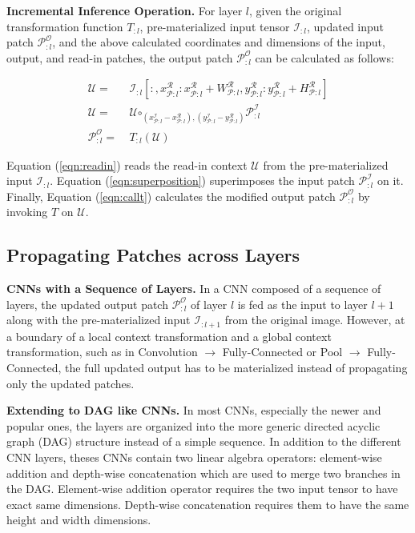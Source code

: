 \vspace{2mm}
\noindent \textbf{Incremental Inference Operation.} For layer $l$, given the original transformation function $T_{:l}$, pre-materialized input tensor $\mathcal{I}_{:l}$, updated input patch $\mathcal{P}^\mathcal{O}_{:l}$, and the above calculated coordinates and dimensions of the input, output, and read-in patches, the output patch $\mathcal{P}^\mathcal{O}_{:l}$ can be calculated as follows:

\begin{align}
\label{eqn:readin}
\mathcal{U} =&~ \mathcal{I}_{:l}[:,x^\mathcal{R}_{\mathcal{P}:l}:x^\mathcal{R}_{\mathcal{P}:l}+W^\mathcal{R}_{\mathcal{P}:l}, y^\mathcal{R}_{\mathcal{P}:l}: y^\mathcal{R}_{\mathcal{P}:l}+ H^\mathcal{R}_{\mathcal{P}:l}]\\
\label{eqn:superposition}
\mathcal{U} =&~ \mathcal{U} \bm\circ_{(x^\mathcal{I}_{\mathcal{P}:l}-x^\mathcal{R}_{\mathcal{P}:l}),(y^\mathcal{I}_{\mathcal{P}:l}-y^\mathcal{R}_{\mathcal{P}:l})} \mathcal{P}^{\mathcal{I}}_{:l}\\
\label{eqn:callt}
\mathcal{P}^\mathcal{O}_{:l} =&~ T_{:l}(\mathcal{U})
\end{align}

Equation (\ref{eqn:readin}) reads the read-in context $\mathcal{U}$ from the pre-materialized input $\mathcal{I}_{:l}$. Equation (\ref{eqn:superposition}) superimposes the input patch $\mathcal{P}^\mathcal{I}_{:l}$ on it.
Finally, Equation (\ref{eqn:callt}) calculates the modified output patch $\mathcal{P}^{\mathcal{O}}_{:l}$ by invoking $T$ on $\mathcal{U}$.


\subsection{Propagating Patches across Layers}

\vspace{2mm}
\noindent \textbf{CNNs with a Sequence of Layers.} In a CNN composed of a sequence of layers, the updated output patch $\mathcal{P}^{\mathcal{O}}_{:l}$ of layer $l$ is fed as the input to layer $l+1$ along with the pre-materialized input $\mathcal{I}_{:l+1}$ from the original image.
However, at a boundary of a local context transformation and a global context transformation, such as in Convolution $\rightarrow$ Fully-Connected or Pool $\rightarrow$ Fully-Connected, the full updated output has to be materialized instead of propagating only the updated patches.

\vspace{2mm}
\noindent \textbf{Extending to DAG like CNNs.} In most CNNs, especially the newer and popular ones, the layers are organized into the more generic directed acyclic graph (DAG) structure instead of a simple sequence.
In addition to the different CNN layers, theses CNNs contain two linear algebra operators: element-wise addition and depth-wise concatenation which are used to merge two branches in the DAG. 
Element-wise addition operator requires the two input tensor to have exact same dimensions.
Depth-wise concatenation requires them to have the same height and width dimensions.

